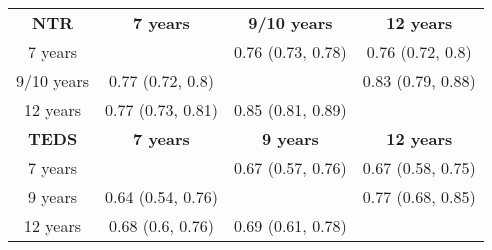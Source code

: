 \begin{tabular}{cccc}
	\textbf{NTR}  & \textbf{7 years}  & \textbf{9/10 years} & \textbf{12 years} \\
	7 years       &                   & \cellcolor{blue!25} 0.76 (0.73, 0.78)   &\cellcolor{blue!25} 0.76 (0.72, 0.8) \\
	9/10 years    & \cellcolor{green!25}0.77 (0.72, 0.8)  &                     & \cellcolor{blue!25}0.83 (0.79, 0.88) \\
	12 years      & \cellcolor{green!25}0.77 (0.73, 0.81) & \cellcolor{green!25}0.85 (0.81, 0.89)   & \\
	\textbf{TEDS} & \textbf{7 years}  & \textbf{9 years}    & \textbf{12 years} \\
	7 years       &                   & \cellcolor{blue!25}0.67 (0.57, 0.76)   & \cellcolor{blue!25}0.67 (0.58, 0.75) \\
	9 years       & \cellcolor{green!25}0.64 (0.54, 0.76) &                     & \cellcolor{blue!25}0.77 (0.68, 0.85) \\
	12 years      & \cellcolor{green!25}0.68 (0.6, 0.76)  & \cellcolor{green!25}0.69 (0.61, 0.78)   &
\end{tabular}
